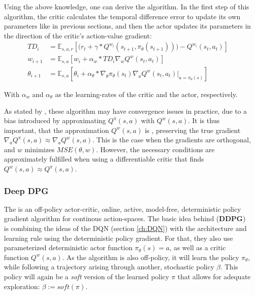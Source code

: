 \noindent Using the above knowledge, one can derive the  algorithm. In the first step of this algorithm, the critic calculates the temporal difference error to update its own parameters like in previous sections, and then the actor updates its parameters in the direction of the critic's action-value gradient:
\begin{align}
	TD_i    &= \mathds{E}_{s,a,r} \left[ \big( r_t + \gamma * Q^{w_i}(s_{t+1}, \pi_{\theta}(s_{t+1})) \big) - Q^{w_i}(s_t, a_t) \right] \label{eq:td_dpg}\\
	w_{i+1} &= \mathds{E}_{s,a} \left[  w_i + \alpha_w * TD_i \nabla_w Q^w(s_t, a_t) \right] \label{eq:critic_dpg} \\
	\theta_{i+1} &= \mathds{E}_{s,a} \left[ \theta_i + \alpha_\theta * \nabla_\theta \pi_\theta(s_t) \nabla_a Q^w(s_t,a_t) \big|_{a=\pi_\theta(s)} \right] \label{eq:actor_dpg}
\end{align}
\begin{flushright} \small With $\alpha_w$ and $\alpha_\theta$ as the learning-rates of the critic and the actor, respectively. \end{flushright}

As stated by \cite{silver_deterministic_2014}, these algorithm may have convergence issues in practice, due to a bias introduced by approximating $Q^\pi(s,a)$ with $Q^w(s,a)$. It is thus important, that the approximation $Q^w(s,a)$ is , preserving the true gradient $\nabla_a Q^\pi(s,a) \approx \nabla_a Q^w(s,a)$. This is the case when the gradients are orthogonal, and $w$ minimizes $MSE(\theta,w)$. However, the necessary conditions are approximately fulfilled when using a differentiable critic that finds $Q^w(s,a) \approx Q^\pi(s,a)$.


\subsubsection*{Deep DPG} \label{ch:ddpg}

The  is an off-policy actor-critic, online, active, model-free, deterministic policy gradient algorithm for continous action-spaces. The basic idea behind  (\textbf{DDPG})\cite{lillicrap_continuous_2015} is combining the ideas of the DQN (section \ref{ch:DQN}) with the architecture and learning rule using the deterministic policy gradient. For that, they also use parameterized deterministic actor function $\pi_\theta(s) = a$, as well as a critic function $Q^w(s,a)$. As the algorithm is also off-policy, it will learn the policy $\pi_\theta$, while following a trajectory arising through another, stochastic policy $\beta$. This policy will again be a \textit{soft} version of the learned policy $\pi$ that allows for adequate exploration: $\beta := soft(\pi)$.

